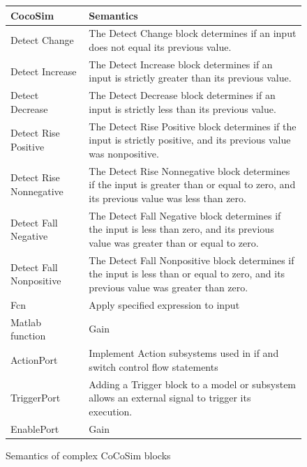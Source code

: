 \documentclass{article}
\begin{document}
\begin{figure}[t]
\centering
{
\begin{tabular}{lp{6cm}}
\hline
\textbf{CocoSim} & \textbf{Semantics}  \\
\hline

Detect Change &
The Detect Change block determines if an input does not equal its previous value.
\\

Detect Increase &
The Detect Increase block determines if an input is strictly greater than its previous value.
\\

Detect Decrease &
The Detect Decrease block determines if an input is strictly less than its previous value.
\\

Detect Rise Positive &
The Detect Rise Positive block determines if the input is strictly positive, and its previous value was nonpositive.
\\

Detect Rise Nonnegative &
The Detect Rise Nonnegative block determines if the input is greater than or equal to zero, and its previous value was less than zero.
\\

Detect Fall Negative &
The Detect Fall Negative block determines if the input is less than zero, and its previous value was greater than or equal to zero.
\\

Detect Fall Nonpositive &
The Detect Fall Nonpositive block determines if the input is less than or equal to zero, and its previous value was greater than zero.
\\


Fcn &
Apply specified expression to input
\\

Matlab function &
Gain
\\

ActionPort &
Implement Action subsystems used in if and switch control flow statements
\\

TriggerPort &
Adding a Trigger block to a model or subsystem allows an external signal to trigger its execution.
\\

EnablePort &
Gain
\\

\hline
\end{tabular}
}
\caption{Semantics of complex CoCoSim blocks}
\label{mapping3}
\end{figure}
\end{document}

